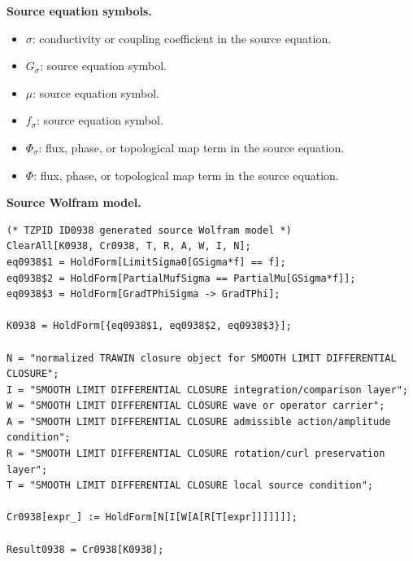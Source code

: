 \begin{minipage}[t]{0.49\linewidth}
\begingroup
\small
\raggedright
\textbf{Source equation symbols.}\par
\begin{itemize}[leftmargin=1.35em,itemsep=1pt,topsep=1pt,parsep=0pt]
    \item $\sigma$: conductivity or coupling coefficient in the source equation.
    \item $G_{\sigma}$: source equation symbol.
    \item $\mu$: source equation symbol.
    \item $f_{\sigma}$: source equation symbol.
    \item $\Phi_{\sigma}$: flux, phase, or topological map term in the source equation.
    \item $\Phi$: flux, phase, or topological map term in the source equation.
\end{itemize}
\endgroup
\end{minipage}\hfill
\begin{minipage}[t]{0.47\linewidth}
\begingroup
\scriptsize
\raggedright
\textbf{Source Wolfram model.}\par
\begin{Verbatim}[fontsize=\tiny,breaklines=true,breakanywhere=true]
(* TZPID ID0938 generated source Wolfram model *)
ClearAll[K0938, Cr0938, T, R, A, W, I, N];
eq0938$1 = HoldForm[LimitSigma0[GSigma*f] == f];
eq0938$2 = HoldForm[PartialMufSigma == PartialMu[GSigma*f]];
eq0938$3 = HoldForm[GradTPhiSigma -> GradTPhi];

K0938 = HoldForm[{eq0938$1, eq0938$2, eq0938$3}];

N = "normalized TRAWIN closure object for SMOOTH LIMIT DIFFERENTIAL CLOSURE";
I = "SMOOTH LIMIT DIFFERENTIAL CLOSURE integration/comparison layer";
W = "SMOOTH LIMIT DIFFERENTIAL CLOSURE wave or operator carrier";
A = "SMOOTH LIMIT DIFFERENTIAL CLOSURE admissible action/amplitude condition";
R = "SMOOTH LIMIT DIFFERENTIAL CLOSURE rotation/curl preservation layer";
T = "SMOOTH LIMIT DIFFERENTIAL CLOSURE local source condition";

Cr0938[expr_] := HoldForm[N[I[W[A[R[T[expr]]]]]]];

Result0938 = Cr0938[K0938];
\end{Verbatim}
\endgroup
\end{minipage}

